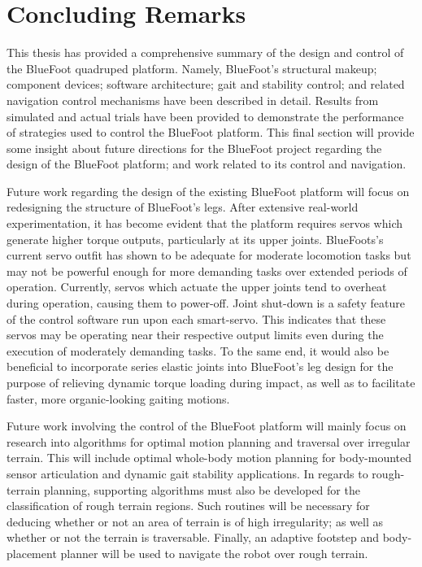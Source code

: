 \chapter{Concluding Remarks}
	\label{ch::conclusion}


	This thesis has provided a comprehensive summary of the design and control of the BlueFoot quadruped platform. Namely, BlueFoot's structural makeup; component devices; software architecture; gait and stability control; and related navigation control mechanisms have been described in detail. Results from simulated and actual trials have been provided to demonstrate the performance of strategies used to control the BlueFoot platform. This final section will provide some insight about future directions for the BlueFoot project regarding the design of the BlueFoot platform; and work related to its control and navigation.


	Future work regarding the design of the existing BlueFoot platform will focus on redesigning the structure of BlueFoot's legs. After extensive real-world experimentation, it has become evident that the platform requires servos which generate higher torque outputs, particularly at its upper joints. BlueFoots's current servo outfit has shown to be adequate for moderate locomotion tasks but may not be powerful enough for more demanding tasks over extended periods of operation. Currently, servos which actuate the upper joints tend to overheat during operation, causing them to power-off. Joint shut-down is a safety feature of the control software run upon each smart-servo. This indicates that these servos may be operating near their respective output limits even during the execution of moderately demanding tasks. To the same end, it would also be beneficial to incorporate series elastic joints into  BlueFoot's leg design for the purpose of relieving dynamic torque loading during impact, as well as to facilitate faster, more organic-looking gaiting motions.


	Future work involving the control of the BlueFoot platform will mainly focus on research into algorithms for optimal motion planning and traversal over irregular terrain. This will include optimal whole-body motion planning for body-mounted sensor articulation and dynamic gait stability applications. In regards to rough-terrain planning, supporting algorithms must also be developed for the classification of rough terrain regions. Such routines will be necessary for deducing whether or not an area of terrain is of high irregularity; as well as whether or not the terrain is traversable. Finally, an adaptive footstep and body-placement planner will be used to navigate the robot over rough terrain. 


